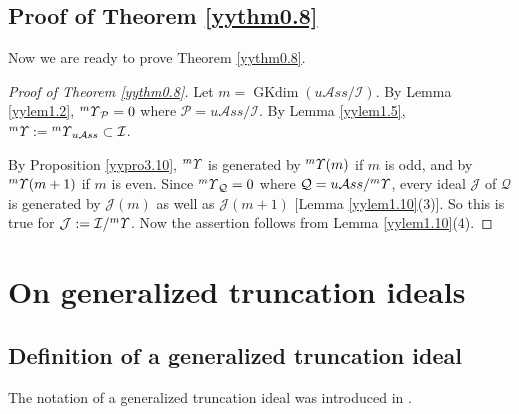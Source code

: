 \documentclass{amsart}
\theoremstyle{definition}
\theoremstyle{remark}
\numberwithin{equation}{section}
\newcommand{\lr}[1]{\langle #1 \rangle}
\newcommand{\up}[1]{{^{#1}{\it \!\Upsilon}}}
\def \uas{u\mathcal{A}ss}
\def \I{\mathcal{I}}
\def \J{\mathcal{J}}
\def \ip{{\mathcal{P}}}
\def \iq{\mathcal {Q}}
\def\gkdim{\operatorname{GKdim}}
\begin{document}

%


\subsection{Proof of Theorem \ref{yythm0.8}}
\label{yysec3.3}
Now we are ready to prove Theorem \ref{yythm0.8}.

\begin{proof}[Proof of Theorem \ref{yythm0.8}]
Let $m=\gkdim (\uas/\I)$. By Lemma \ref{yylem1.2},
$\up{m}_{\ip}=0$ where $\ip=\uas/\I$. By 
Lemma \ref{yylem1.5}, $\up{m}:=\up{m}_{\uas}
\subset \I$. 

By Proposition \ref{yypro3.10}, $\up{m}$ is generated by 
$\up{m}(m)$ if $m$ is odd, and by $\up{m}(m+1)$ if
$m$ is even. Since $\up{m}_{\iq}=0$ where $\iq=\uas/\up{m}$,
every ideal $\J$ of $\iq$ is generated by $\J(m)$ as well
as $\J(m+1)$ [Lemma \ref{yylem1.10}(3)]. So this is true for 
$\J:=\I/\up{m}$. Now the assertion follows from 
Lemma \ref{yylem1.10}(4).
\end{proof}


\section{On generalized truncation ideals}
\label{yysec4}

\subsection{Definition of a generalized truncation ideal}
\label{yysec4.1}

The notation of a generalized truncation ideal was introduced 
in \cite[Section 3.1]{BYZ}. 
\end{document}
